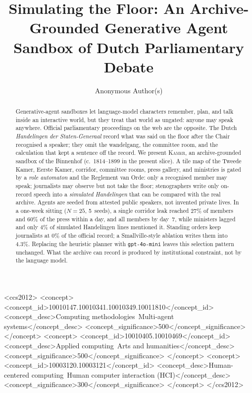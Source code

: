 \documentclass[sigconf,review,anonymous]{acmart}
\newcommand{\sys}{\textsc{Kamer}}
\begin{document}
\title[Simulating the Floor]{Simulating the Floor: An Archive-Grounded
Generative Agent Sandbox of Dutch Parliamentary Debate}

\author{Anonymous Author(s)}

\renewcommand{\shortauthors}{Anonymous et al.}

\begin{abstract}
Generative-agent sandboxes let language-model characters remember, plan, and
talk inside an interactive world, but they treat that world as ungated:
anyone may speak anywhere. Official parliamentary proceedings on the web are
the opposite. The Dutch \emph{Handelingen der Staten-Generaal} record what
was said on the floor after the Chair recognised a speaker; they omit the
wandelgang, the committee room, and the calculation that kept a sentence off
the record. We present \sys{}, an archive-grounded sandbox of the Binnenhof
(c.~1814--1899 in the present slice). A tile map of the Tweede Kamer, Eerste
Kamer, corridor, committee rooms, press gallery, and ministries is gated by
a \emph{role automaton} and the Reglement van Orde: only a recognised member
may speak; journalists may observe but not take the floor; stenographers
write only on-record speech into a \emph{simulated Handelingen} that can be
compared with the real archive. Agents are seeded from attested public
speakers, not invented private lives. In a one-week sitting ($N{=}25$,
5~seeds), a single corridor leak reached $27\%$ of members and $60\%$ of the
press within a day, and all members by day~7, while ministers lagged and
only $4\%$ of simulated Handelingen lines mentioned it. Standing orders keep
journalists at $0\%$ of the official record; a Smallville-style ablation
writes them into $4.3\%$. Replacing the heuristic planner with
\texttt{gpt-4o-mini} leaves this selection pattern unchanged. What the
archive can record is produced by institutional constraint, not by the
language model.
\end{abstract}

\begin{CCSXML}
<ccs2012>
<concept>
<concept_id>10010147.10010341.10010349.10011810</concept_id>
<concept_desc>Computing methodologies~Multi-agent systems</concept_desc>
<concept_significance>500</concept_significance>
</concept>
<concept>
<concept_id>10010405.10010469</concept_id>
<concept_desc>Applied computing~Arts and humanities</concept_desc>
<concept_significance>500</concept_significance>
</concept>
<concept>
<concept_id>10003120.10003121</concept_id>
<concept_desc>Human-centered computing~Human computer interaction (HCI)</concept_desc>
<concept_significance>300</concept_significance>
</concept>
</ccs2012>
\end{CCSXML}
\end{document}
